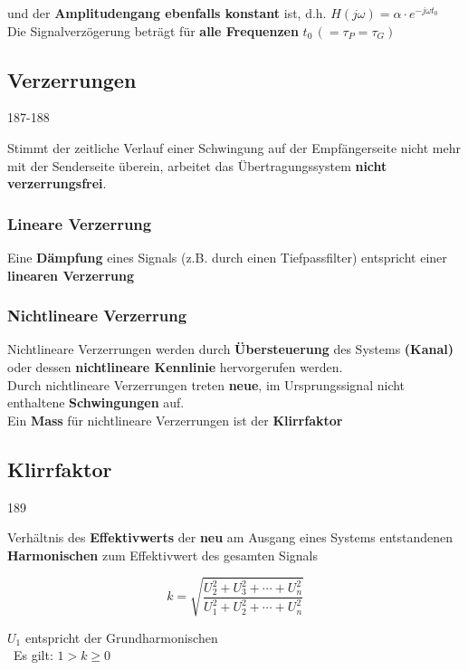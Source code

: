 und der \textbf{Amplitudengang ebenfalls konstant} ist, d.h. $H(j \omega) = \alpha \cdot e^{-j \omega t_0}$ \\
Die Signalverzögerung beträgt für \textbf{alle Frequenzen} $t_0 \, (= \tau_P = \tau_G) $ 


\subsection{Verzerrungen}{187-188}

Stimmt der zeitliche Verlauf einer Schwingung auf der Empfängerseite nicht mehr mit der Senderseite überein, arbeitet das
Übertragungssystem \textbf{nicht verzerrungsfrei}.


\subsubsection{Lineare Verzerrung}

Eine \textbf{Dämpfung} eines Signals (z.B. durch einen Tiefpassfilter) entspricht einer \textbf{linearen Verzerrung}


\subsubsection{Nichtlineare Verzerrung}

Nichtlineare Verzerrungen werden durch \textbf{Übersteuerung} des Systems \textbf{(Kanal)} oder dessen
\textbf{nichtlineare Kennlinie} hervorgerufen werden. \\
Durch nichtlineare Verzerrungen treten \textbf{neue}, im Ursprungssignal nicht enthaltene \textbf{Schwingungen} auf.\\
Ein \textbf{Mass} für nichtlineare Verzerrungen ist der \textbf{Klirrfaktor}


\subsection{Klirrfaktor}{189}

Verhältnis des \textbf{Effektivwerts} der \textbf{neu} am Ausgang eines Systems entstandenen \textbf{Harmonischen} zum 
Effektivwert des gesamten Signals

\begin{minipage}[b]{0.48\columnwidth}
    $$ \boxed{ k = \sqrt{\frac{U_2^2 + U_3^2 + \cdots + U_n^2}{U_1^2 + U_2^2 + \cdots + U_n^2}}} $$
\end{minipage}
\hfill
\begin{minipage}[c]{0.48\columnwidth}
    \raggedright%
    $U_1$ entspricht der Grundharmonischen\\
    \textrightarrow\ Es gilt: $1 > k \geq 0$
\end{minipage}


